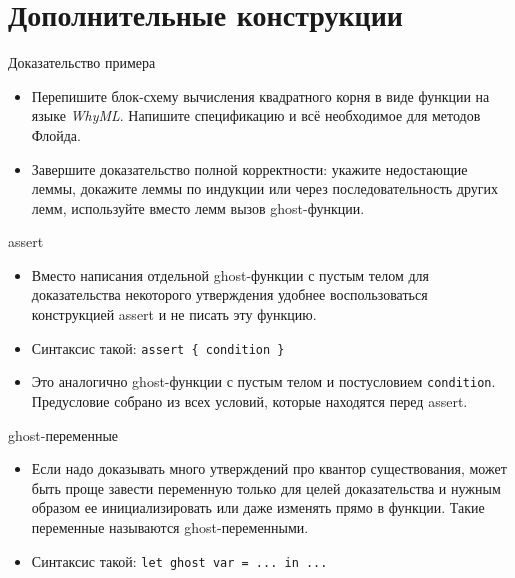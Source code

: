 \documentclass[hyperref={unicode=true}]{beamer}
\begin{document}
    \section{Дополнительные конструкции}

    \begin{frame}{Доказательство примера}
    \begin{itemize}
    \item
    Перепишите блок-схему вычисления квадратного корня в виде функции
    на языке \textsl{WhyML}. Напишите спецификацию и всё необходимое
    для методов Флойда.
    \item
    Завершите доказательство полной корректности: укажите недостающие
    леммы, докажите леммы по индукции или через последовательность
    других лемм, используйте вместо лемм вызов ghost-функции.
    \end{itemize}
    \end{frame}

    \begin{frame}{assert}
    \begin{itemize}
    \item
    Вместо написания отдельной ghost-функции с пустым телом для
    доказательства некоторого утверждения удобнее воспользоваться
    конструкцией assert и не писать эту функцию.
    \item
    Синтаксис такой: \texttt{assert \{ condition \}}
    \item
    Это аналогично ghost-функции с пустым телом и постусловием
    \texttt{condition}. Предусловие собрано из всех условий, которые
    находятся перед assert.
    \end{itemize}
    \end{frame}

    \begin{frame}{ghost-переменные}
    \begin{itemize}
    \item
    Если надо доказывать много утверждений про квантор существования,
    может быть проще завести переменную только для целей доказательства
    и нужным образом ее инициализировать или даже изменять прямо
    в функции. Такие переменные называются ghost-переменными.
    \item
    Синтаксис такой: \texttt{let ghost var = ... in ...}
    \end{itemize}
    \end{frame}
\end{document}
